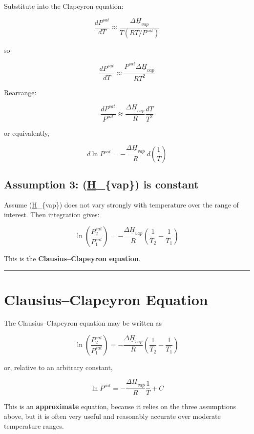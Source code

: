 \documentclass[
  letterpaper,
  DIV=11,
  numbers=noendperiod]{scrartcl}
\begin{document}
Substitute into the Clapeyron equation:

\[
\frac{dP^{sat}}{dT}
\approx
\frac{\Delta \underline{H}_{vap}}{T(RT/P^{sat})}
\]

so

\[
\frac{dP^{sat}}{dT}
\approx
\frac{P^{sat}\Delta \underline{H}_{vap}}{RT^2}
\]

Rearrange:

\[
\frac{dP^{sat}}{P^{sat}}
\approx
\frac{\Delta \underline{H}_{vap}}{R}\frac{dT}{T^2}
\]

or equivalently,

\[
d\ln P^{sat}
=
-\frac{\Delta \underline{H}_{vap}}{R}\,d\left(\frac{1}{T}\right)
\]

\subsection{\texorpdfstring{Assumption 3:
(\Delta \underline{H}\_\{vap\}) is
constant}{Assumption 3: (\_\{vap\}) is constant}}\label{assumption-3-_vap-is-constant}

Assume (\Delta \underline{H}\_\{vap\}) does not vary strongly with
temperature over the range of interest. Then integration gives:

\[
\ln\left(\frac{P_2^{sat}}{P_1^{sat}}\right)
=
-\frac{\Delta \underline{H}_{vap}}{R}
\left(\frac{1}{T_2}-\frac{1}{T_1}\right)
\]

This is the \textbf{Clausius--Clapeyron equation}.

\begin{center}\rule{0.5\linewidth}{0.5pt}\end{center}

\section{Clausius--Clapeyron Equation}\label{clausiusclapeyron-equation}

The Clausius--Clapeyron equation may be written as

\[
\boxed{
\ln\left(\frac{P_2^{sat}}{P_1^{sat}}\right)
=
-\frac{\Delta \underline{H}_{vap}}{R}
\left(\frac{1}{T_2}-\frac{1}{T_1}\right)
}
\]

or, relative to an arbitrary constant,

\[
\ln P^{sat} = -\frac{\Delta \underline{H}_{vap}}{R}\frac{1}{T} + C
\]

This is an \textbf{approximate} equation, because it relies on the three
assumptions above, but it is often very useful and reasonably accurate
over moderate temperature ranges.
\end{document}

